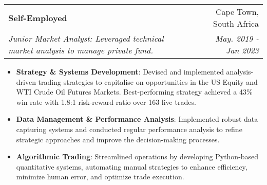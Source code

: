 \documentclass[a4paper,11pt]{article}
\makeatletter
\newcommand{\resumeItem}[2]{
  \item\small{
    \textbf{#1}{: #2 \vspace{-2pt}}
  }
}
\newcommand{\resumeSubheading}[4]{
  \vspace{-1pt}\item
    \begin{tabular*}{0.97\textwidth}[t]{l@{\extracolsep{\fill}}r}
      \textbf{#1} & #2 \\
      \textit{\small#3} & \textit{\small #4} \\
  \end{tabular*}\vspace{-10pt}
}
\newcommand{\resumeItemListStart}{\begin{itemize}}
\newcommand{\resumeItemListEnd}{\end{itemize}\vspace{-10pt}}
\makeatother
\begin{document}
    \resumeSubheading
      {Self-Employed}{Cape Town, South Africa}
      {Junior Market Analyst: Leveraged technical market analysis to manage private fund.}{May. 2019 - Jan 2023}
      
      \resumeItemListStart
        \resumeItem{Strategy \& Systems Development}
          {Devised and implemented analysis-driven trading strategies to capitalise on opportunities in the US Equity and WTI Crude Oil Futures Markets. Best-performing strategy achieved a 43\% win rate with 1.8:1 risk-reward ratio over 163 live trades.}
        \resumeItem{Data Management \& Performance Analysis}
          {Implemented robust data capturing systems and conducted regular performance analysis to refine strategic approaches and improve the decision-making processes.}
        \resumeItem{Algorithmic Trading}
          {Streamlined operations by developing Python-based quantitative systems, automating manual strategies to enhance efficiency, minimize human error, and optimize trade execution.}
      \resumeItemListEnd

      
\end{document}
